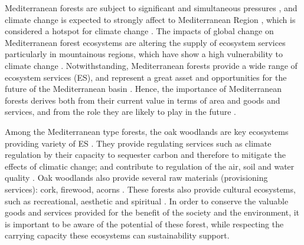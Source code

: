 Mediterranean forests are subject to significant and simultaneous pressures \autocites{FAOPlanBleu2018StateMediterranean, DoblasMirandaetal2017ReviewCombination}, and climate change is expected to strongly affect to Mediterranean Region \autocite{GiorgiLionello2008ClimateChange, Penuelasetal2017ImpactsGlobal,Crameretal2018ClimateChange,Crameretal2020ClimateEnvironmental}, which is considered a hotspot for climate change \autocite{Giorgi2006ClimateChange}. The impacts of global change on Mediterranean forest ecosystems are altering the supply of ecosystem services \autocite{Lindneretal2010ClimateChange,Lindneretal2014ClimateChange,NoceSantini2018MediterraneanForest,Penuelasetal2017ImpactsGlobal,SerradaHierroetal2011ImpactosVulnerabilidad} particularly in mountainous regions, which have show a high vulnerability to climate change \autocite{Schroteretal2005EcosystemService}. Notwithstanding, Mediterranean forests provide a wide range of ecosystem services (ES), and represent a great asset and opportunities for the future of the Mediterranean basin \autocite{Gauquelinetal2018MediterraneanForests, NoceSantini2018MediterraneanForest}. Hence, the importance of Mediterranean forests derives both from their current value in terms of area and goods and services, and from the role they are likely to play in the future \autocites{FAOPlanBleu2018StateMediterranean}.

Among the Mediterranean type forests, the oak woodlands are key ecosystems providing variety of ES \autocite{Maranonetal2020IberianOaks}. They provide regulating services such as climate regulation by their capacity to sequester carbon and therefore to mitigate the effects of climatic change; and contribute to regulation of the air, soil and water quality \autocite{Maranonetal2012EstadoTendencia}. Oak woodlands also provide several raw materials (provisioning services): cork, firewood, acorns \autocite{Bugalhoetal2011MediterraneanCork}. These forests also provide cultural ecosystems, such as recreational, aesthetic and spiritual \autocite{Lofetal2016ManagementOak}. In order to conserve the valuable goods and services provided for the benefit of the society and the environment, it is important to be aware of the potential of these forest, while respecting the carrying capacity these ecosystems can sustainability support. 


